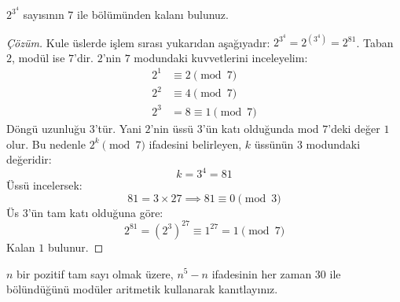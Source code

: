 \begin{example}
$2^{3^4}$ sayısının $7$ ile bölümünden kalanı bulunuz.
\end{example}

\begin{proof}[Çözüm]
Kule üslerde işlem sırası yukarıdan aşağıyadır: $2^{3^4} = 2^{(3^4)} = 2^{81}$.
Taban $2$, modül ise $7$'dir. $2$'nin $7$ modundaki kuvvetlerini inceleyelim:
\begin{align*}
2^1 &\equiv 2 \pmod 7 \\
2^2 &\equiv 4 \pmod 7 \\
2^3 &= 8 \equiv 1 \pmod 7
\end{align*}
Döngü uzunluğu $3$'tür. Yani $2$'nin üssü $3$'ün katı olduğunda mod $7$'deki değer $1$ olur.
Bu nedenle $2^k \pmod 7$ ifadesini belirleyen, $k$ üssünün $3$ modundaki değeridir:
\[
k = 3^4 = 81
\]
Üssü incelersek:
\[
81 = 3 \times 27 \implies 81 \equiv 0 \pmod 3
\]
Üs $3$'ün tam katı olduğuna göre:
\[
2^{81} = (2^3)^{27} \equiv 1^{27} = 1 \pmod 7
\]
Kalan $1$ bulunur.
\end{proof}

\begin{example}
$n$ bir pozitif tam sayı olmak üzere, $n^5 - n$ ifadesinin her zaman $30$ ile bölündüğünü modüler aritmetik kullanarak kanıtlayınız.
\end{example}

